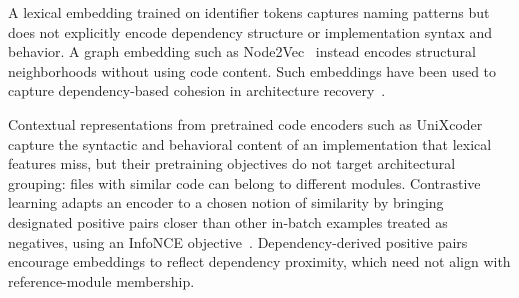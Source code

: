 A lexical embedding trained on identifier tokens captures naming patterns but does not explicitly encode dependency structure or implementation syntax and behavior. A graph embedding such as Node2Vec~\cite{node2vec} instead encodes structural neighborhoods without using code content. Such embeddings have been used to capture dependency-based cohesion in architecture recovery~\cite{negar,structsar}.

Contextual representations from pretrained code encoders such as UniXcoder~\cite{unixcoder} capture the syntactic and behavioral content of an implementation that lexical features miss, but their pretraining objectives do not target architectural grouping: files with similar code can belong to different modules. Contrastive learning adapts an encoder to a chosen notion of similarity by bringing designated positive pairs closer than other in-batch examples treated as negatives, using an InfoNCE objective~\cite{infonce}. Dependency-derived positive pairs encourage embeddings to reflect dependency proximity, which need not align with reference-module membership.